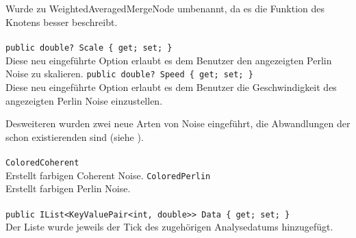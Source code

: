\subsection{}

\paragraph{}
\begin{itemize}
	\change Wurde zu WeightedAveragedMergeNode umbenannt, da es die Funktion des Knotens besser beschreibt.
\end{itemize}

\paragraph{}
\begin{itemize}
	\add \verb!public double? Scale { get; set; }! \\
	Diese neu eingeführte Option erlaubt es dem Benutzer den angezeigten Perlin Noise zu skalieren.
	\add \verb!public double? Speed { get; set; }! \\
	Diese neu eingeführte Option erlaubt es dem Benutzer die Geschwindigkeit des angezeigten Perlin Noise einzustellen.
\end{itemize}

Desweiteren wurden zwei neue Arten von Noise eingeführt, die Abwandlungen der schon existierenden sind (siehe ).

\paragraph{}
\begin{itemize}
	\add \verb!ColoredCoherent! \\
	Erstellt farbigen Coherent Noise.
	\add \verb!ColoredPerlin! \\
	Erstellt farbigen Perlin Noise.
\end{itemize}

\paragraph{}
\begin{itemize}
	\change \verb!public IList<KeyValuePair<int, double>> Data { get; set; }! \\
	Der Liste wurde jeweils der Tick des zugehörigen Analysedatums hinzugefügt.
\end{itemize}

